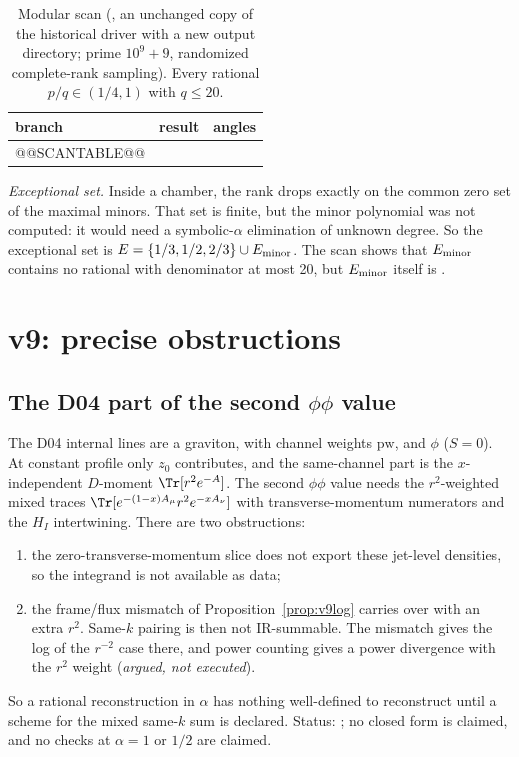 \begin{center}
\scriptsize
\begin{longtable}{@{}lll@{}}
\caption{Modular scan (, an unchanged copy of the historical driver with a new output directory; prime \(10^9+9\), randomized complete-rank sampling). Every rational \(p/q\in(1/4,1)\) with \(q\le20\).}\label{tab:v9scan}\\
\toprule
branch & result & angles\\
\midrule
@@SCANTABLE@@
\bottomrule
\end{longtable}
\end{center}

\noindent\emph{Exceptional set.} Inside a chamber, the rank drops
exactly on the common zero set of the maximal minors. That set is
finite, but the minor polynomial was not computed: it would need a
symbolic-\(\alpha\) elimination of unknown degree. So the
exceptional set is \(E=\{1/3,1/2,2/3\}\cup E_{\rm minor}\). The
scan shows that \(E_{\rm minor}\) contains no rational with
denominator at most 20, but \(E_{\rm minor}\) itself is \OPEN.

\section{v9: precise obstructions}
\label{sec:v9obs}

\subsection{The D04 part of the second \texorpdfstring{\(\phi\phi\)}{phi phi} value}
\label{sec:v9D04}

The D04 internal lines are a graviton, with channel weights
\(\mathrm{pw}\), and \(\phi\) (\(S=0\)). At constant profile only
\(z_0\) contributes, and the same-channel part is the
\(x\)-independent \(D\)-moment
\(\Tr[r^2e^{-A}]\). The second \(\phi\phi\) value needs the
\(r^2\)-weighted mixed traces
\(\Tr[e^{-(1-x)A_\mu}r^2e^{-xA_\nu}]\) with transverse-momentum
numerators and the \(H_I\) intertwining. There are two
obstructions:
\begin{enumerate}[label=(\alph*)]
\item the zero-transverse-momentum slice does not export these
jet-level densities, so the integrand is not available as data;
\item the frame/flux mismatch of Proposition~\ref{prop:v9log} carries
over with an extra \(r^2\). Same-\(k\) pairing is then not
IR-summable. The mismatch gives the log of the \(r^{-2}\) case
there, and power counting gives a power divergence with the
\(r^2\) weight (\emph{argued, not executed}).
\end{enumerate}
So a rational reconstruction in \(\alpha\) has nothing
well-defined to reconstruct until a scheme for the mixed
same-\(k\) sum is declared. Status: \OPEN; no closed form is
claimed, and no checks at \(\alpha=1\) or \(1/2\) are claimed.


